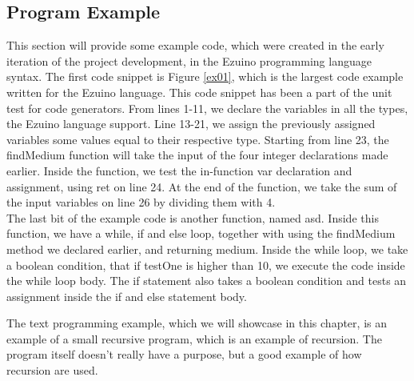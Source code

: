 \subsection{Program Example}
This section will provide some example code, which were created in the early iteration of the project development, in the Ezuino programming language syntax. The first code snippet is Figure \ref{ex01}, which is the largest code example written for the Ezuino language. This code snippet has been a part of the unit test for code generators. From lines 1-11, we declare the variables in all the types, the Ezuino language support. Line 13-21, we assign the previously assigned variables some values equal to their respective type. Starting from line 23, the findMedium function will take the input of the four integer declarations made earlier. Inside the function, we test the in-function var declaration and assignment, using ret on line 24. At the end of the function, we take the sum of the input variables on line 26 by dividing them with 4. \\
The last bit of the example code is another function, named asd. Inside this function, we have a while, if and else loop, together with using the findMedium method we declared earlier, and returning medium. Inside the while loop, we take a boolean condition, that if testOne is higher than 10, we execute the code inside the while loop body. The if statement also takes a boolean condition and tests an assignment inside the if and else statement body.

\noindent\newline
The text programming example, which we will showcase in this chapter, is an example of a small recursive program, which is an example of recursion. The program itself doesn’t really have a purpose, but a good example of how recursion are used.
